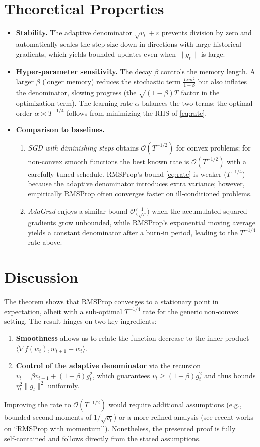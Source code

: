 \documentclass{article}
\begin{document}
\section*{Theoretical Properties}
\begin{itemize}
\item \textbf{Stability.} The adaptive denominator $\sqrt{v_{t}}+\varepsilon$ prevents division by zero and automatically scales the step size down in directions with large historical gradients, which yields bounded updates even when $\|g_{t}\|$ is large.
\item \textbf{Hyper‑parameter sensitivity.} The decay $\beta$ controls the memory length. A larger $\beta$ (longer memory) reduces the stochastic term $\frac{L\alpha\sigma^{2}}{1-\beta}$ but also inflates the denominator, slowing progress (the $\sqrt{(1-\beta)T}$ factor in the optimization term). The learning‑rate $\alpha$ balances the two terms; the optimal order $\alpha\asymp T^{-1/4}$ follows from minimizing the RHS of \eqref{eq:rate}.
\item \textbf{Comparison to baselines.}
    \begin{enumerate}
        \item \textit{SGD with diminishing steps} obtains $\mathcal{O}(T^{-1/2})$ for convex problems; for non‑convex smooth functions the best known rate is $\mathcal{O}(T^{-1/2})$ with a carefully tuned schedule. RMSProp’s bound \eqref{eq:rate} is weaker ($T^{-1/4}$) because the adaptive denominator introduces extra variance; however, empirically RMSProp often converges faster on ill‑conditioned problems.
        \item \textit{AdaGrad} enjoys a similar bound $\mathcal{O}\bigl(\frac{1}{\sqrt{T}}\bigr)$ when the accumulated squared gradients grow unbounded, while RMSProp’s exponential moving average yields a constant denominator after a burn‑in period, leading to the $T^{-1/4}$ rate above.
    \end{enumerate}
\end{itemize}

\section*{Discussion}
The theorem shows that RMSProp converges to a stationary point in expectation, albeit with a sub‑optimal $T^{-1/4}$ rate for the generic non‑convex setting. The result hinges on two key ingredients:
\begin{enumerate}
\item \textbf{Smoothness} allows us to relate the function decrease to the inner product $\langle\nabla f(w_{t}),w_{t+1}-w_{t}\rangle$.
\item \textbf{Control of the adaptive denominator} via the recursion $v_{t}= \beta v_{t-1}+(1-\beta)g_{t}^{2}$, which guarantees $v_{t}\ge(1-\beta)g_{t}^{2}$ and thus bounds $\eta_{t}^{2}\|g_{t}\|^{2}$ uniformly.
\end{enumerate}
Improving the rate to $\mathcal{O}(T^{-1/2})$ would require additional assumptions (e.g., bounded second moments of $1/\sqrt{v_{t}}$) or a more refined analysis (see recent works on ``RMSProp with momentum’’). Nonetheless, the presented proof is fully self‑contained and follows directly from the stated assumptions.
\end{document}
